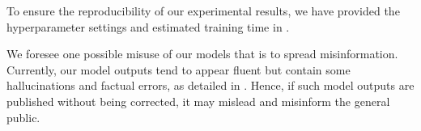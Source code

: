 \documentclass[11pt]{article}
\begin{document}
To ensure the reproducibility of our experimental results, we have provided the hyperparameter settings and estimated training time in .


We foresee one possible misuse of our models that is to spread misinformation. Currently, our model outputs tend to appear fluent but contain some hallucinations and factual errors, as detailed in . Hence, if such model outputs are published without being corrected, it may mislead and misinform the general public.









\newpage

\end{document}
